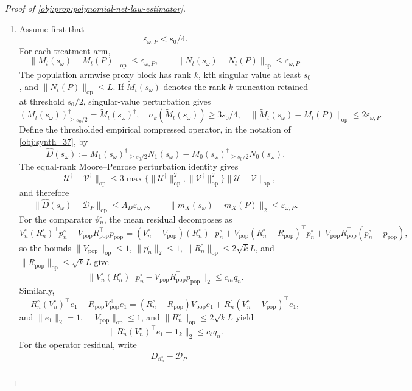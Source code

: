 \documentclass[11pt]{article}
\begin{document}
\begin{proof}[Proof of \cref{obj:prop:polynomial-net-law-estimator}]
\begin{enumerate}
\item Assume first that
\[
\varepsilon_{\omega,P}<s_0/4 .
\]
For each treatment arm,
\[
\|M_t(s_\omega)-M_t(P)\|_{\mathrm{op}}\le\varepsilon_{\omega,P},
\qquad
\|N_t(s_\omega)-N_t(P)\|_{\mathrm{op}}\le\varepsilon_{\omega,P}.
\]
The population armwise proxy block has rank \(k\), kth singular value at least \(s_0\), and \(\|N_t(P)\|_{\mathrm{op}}\le L\).  If \(\widetilde M_t(s_\omega)\) denotes the rank-\(k\) truncation retained at threshold \(s_0/2\), singular-value perturbation gives
\[
(M_t(s_\omega))^\dagger_{\ge s_0/2}=\widetilde M_t(s_\omega)^\dagger,
\quad
\sigma_k(\widetilde M_t(s_\omega))\ge3s_0/4,
\quad
\|\widetilde M_t(s_\omega)-M_t(P)\|_{\mathrm{op}}
\le2\varepsilon_{\omega,P}.
\]
Define the thresholded empirical compressed operator, in the notation of \cref{obj:synth_37}, by
\[
\widehat D(s_\omega):=
M_1(s_\omega)^\dagger{}_{\ge s_0/2}N_1(s_\omega)
-
M_0(s_\omega)^\dagger{}_{\ge s_0/2}N_0(s_\omega).
\]
The equal-rank Moore--Penrose perturbation identity gives
\[
\|\mathcal U^\dagger-\mathcal V^\dagger\|_{\mathrm{op}}
\le
3\max\{\|\mathcal U^\dagger\|_{\mathrm{op}}^2,\|\mathcal V^\dagger\|_{\mathrm{op}}^2\}
\|\mathcal U-\mathcal V\|_{\mathrm{op}},
\]
and therefore
\[
\|\widehat D(s_\omega)-\mathcal D_P\|_{\mathrm{op}}
\le A_D\varepsilon_{\omega,P},
\qquad
\|m_X(s_\omega)-m_X(P)\|_2\le\varepsilon_{\omega,P}.
\]
For the comparator \(\vartheta_n^\circ\), the mean residual decomposes as
\[
V_n^\circ(R_n^\circ)^\top p_n^\circ
-
V_{\mathrm{pop}}R_{\mathrm{pop}}^\top p_{\mathrm{pop}}
=
(V_n^\circ-V_{\mathrm{pop}})(R_n^\circ)^\top p_n^\circ
+
V_{\mathrm{pop}}(R_n^\circ-R_{\mathrm{pop}})^\top p_n^\circ
+
V_{\mathrm{pop}}R_{\mathrm{pop}}^\top(p_n^\circ-p_{\mathrm{pop}}),
\]
so the bounds \(\|V_{\mathrm{pop}}\|_{\mathrm{op}}\le1\), \(\|p_n^\circ\|_2\le1\),
\(\|R_n^\circ\|_{\mathrm{op}}\le2\sqrt{k}L\), and
\(\|R_{\mathrm{pop}}\|_{\mathrm{op}}\le\sqrt{k}L\) give
\[
\|V_n^\circ(R_n^\circ)^\top p_n^\circ
-
V_{\mathrm{pop}}R_{\mathrm{pop}}^\top p_{\mathrm{pop}}\|_2
\le c_mq_n .
\]
Similarly,
\[
R_n^\circ(V_n^\circ)^\top e_1
-
R_{\mathrm{pop}}V_{\mathrm{pop}}^\top e_1
=
(R_n^\circ-R_{\mathrm{pop}})V_{\mathrm{pop}}^\top e_1
+
R_n^\circ(V_n^\circ-V_{\mathrm{pop}})^\top e_1,
\]
and \(\|e_1\|_2=1\), \(\|V_{\mathrm{pop}}\|_{\mathrm{op}}\le1\), and
\(\|R_n^\circ\|_{\mathrm{op}}\le2\sqrt{k}L\) yield
\[
\|R_n^\circ(V_n^\circ)^\top e_1-\mathbf 1_k\|_2\le c_bq_n .
\]
For the operator residual, write
\[
\begin{aligned}
&D_{\vartheta_n^\circ}-\mathcal D_P \\

\end{aligned}\]
\end{enumerate}
\end{proof}
\end{document}
